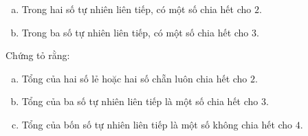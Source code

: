 \begin{bt}
\begin{enumerate}[a)]
\item Trong hai số tự nhiên liên tiếp, có một số chia  hết cho $2$.
\item Trong ba số tự nhiên liên tiếp, có một số chia  hết cho $3$.
\end{enumerate}
\end{bt}    \begin{bt}
Chứng tỏ rằng:
\begin{enumerate}[a)]
\item Tổng của hai số lẻ hoặc hai số chẵn luôn chia hết cho $2$.
\item Tổng của ba số tự nhiên liên tiếp là một số chia hết cho $3$.
\item Tổng của bốn số tự nhiên liên tiếp là một số không chia hết cho $4$.
\end{enumerate}
\end{bt} 